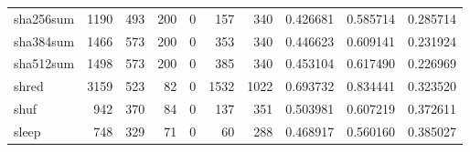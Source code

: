 \begin{tabular}{lrrrrrrrrr}
sha256sum &                                               1190 &                                                493 &                                                200 &                                                  0 &                                                157 &                                                340 &                                           0.426681 &                               0.585714 &                             0.285714 \\
sha384sum &                                               1466 &                                                573 &                                                200 &                                                  0 &                                                353 &                                                340 &                                           0.446623 &                               0.609141 &                             0.231924 \\
sha512sum &                                               1498 &                                                573 &                                                200 &                                                  0 &                                                385 &                                                340 &                                           0.453104 &                               0.617490 &                             0.226969 \\
shred     &                                               3159 &                                                523 &                                                 82 &                                                  0 &                                               1532 &                                               1022 &                                           0.693732 &                               0.834441 &                             0.323520 \\
shuf      &                                                942 &                                                370 &                                                 84 &                                                  0 &                                                137 &                                                351 &                                           0.503981 &                               0.607219 &                             0.372611 \\
sleep     &                                                748 &                                                329 &                                                 71 &                                                  0 &                                                 60 &                                                288 &                                           0.468917 &                               0.560160 &                             0.385027 \\

\end{tabular}
